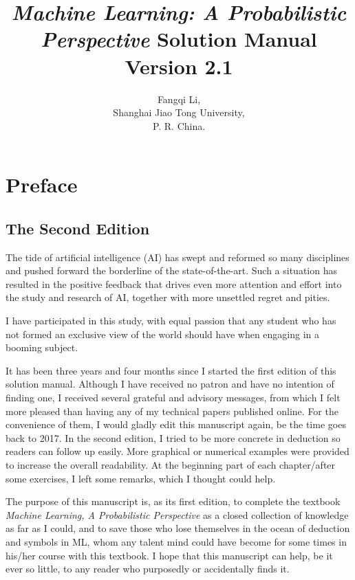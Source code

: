 \documentclass[UTF8]{ctexart}
\begin{document}
\title{\emph{Machine Learning: A Probabilistic Perspective} Solution Manual Version 2.1}
\author{Fangqi Li,\\ Shanghai Jiao Tong University,\\ P. R. China.}
\date{}
\maketitle
\tableofcontents
\newpage
\section{Preface}
\subsection{The Second Edition}
The tide of artificial intelligence (AI) has swept and reformed so many disciplines and pushed forward the borderline of the state-of-the-art.
Such a situation has resulted in the positive feedback that drives even more attention and effort into the study and research of AI, together with more unsettled regret and pities.

I have participated in this study, with equal passion that any student who has not formed an exclusive view of the world should have when engaging in a booming subject.

It has been three years and four months since I started the first edition of this solution manual.
Although I have received no patron and have no intention of finding one, I received several grateful and advisory messages, from which I felt more pleased than having any of my technical papers published online.
For the convenience of them, I would gladly edit this manuscript again, be the time goes back to 2017.
In the second edition, I tried to be more concrete in deduction so readers can follow up easily.
More graphical or numerical examples were provided to increase the overall readability.
At the beginning part of each chapter/after some exercises, I left some remarks, which I thought could help.

The purpose of this manuscript is, as its first edition, to complete the textbook \emph{Machine Learning, A Probabilistic Perspective} as a closed collection of knowledge as far as I could, and to save those who lose themselves in the ocean of deduction and symbols in ML, whom any talent mind could have become for some times in his/her course with this textbook.
I hope that this manuscript can help, be it ever so little, to any reader who purposedly or accidentally finds it.
\end{document}
